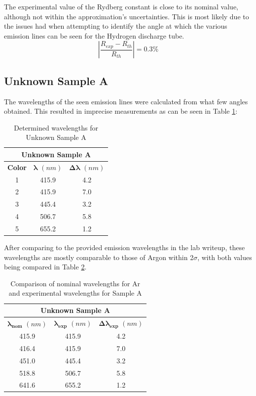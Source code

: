 \documentclass[a4paper, twocolumn]{article}
\begin{document}
The experimental value of the Rydberg constant is close to its nominal value, although not within the approximation's uncertainties. This is most likely due to the
issues had when attempting to identify the angle at which the various emission lines can be seen for the Hydrogen discharge tube.
\begin{equation*}
\left|\frac{R_{exp}-R_{th}}{R_{th}}\right| = 0.3\%
\end{equation*}

\subsection{Unknown Sample A}

The wavelengths of the seen emission lines were calculated from what few angles obtained. This resulted in imprecise measurements as can be seen in Table \ref{table:lambdaA}:
\begin{table}[h!]
\centering
\begin{tabular}{ |c||c|c| }
 \hline
 \multicolumn{3}{|c|}{\textbf{Unknown Sample A}} \\
 \hline
 \textbf{Color} & $\boldsymbol{\lambda}$ $(nm)$ & $\boldsymbol{\Delta\lambda}$ $(nm)$ \\
 \hline
 1 & 415.9 & 4.2 \\
 \hline
 2 & 415.9 & 7.0 \\
 \hline
 3 & 445.4 & 3.2 \\
 \hline
 4 & 506.7 & 5.8 \\
 \hline
 5 & 655.2 & 1.2 \\
 \hline
\end{tabular}
\caption{Determined wavelengths for Unknown Sample A}
\label{table:lambdaA}
\end{table}

After comparing to the provided emission wavelengths in the lab writeup, these wavelengths are mostly comparable to those of Argon within 2$\sigma$, 
with both values being compared in Table \ref{table:comparisonA}.

\begin{table}[h!]
\centering
\begin{tabular}{ |c|c|c| }
 \hline
 \multicolumn{3}{|c|}{\textbf{Unknown Sample A}} \\
 \hline
 $\boldsymbol{\lambda_{nom}}$ $(nm)$ & $\boldsymbol{\lambda_{exp}}$ $(nm)$ & $\boldsymbol{\Delta\lambda_{exp}}$  $(nm)$ \\
 \hline
 415.9 & 415.9 & 4.2 \\
 \hline
 416.4 & 415.9 & 7.0 \\
 \hline
 451.0 & 445.4 & 3.2 \\ 
 \hline
 518.8 & 506.7 & 5.8 \\
 \hline
 641.6 & 655.2 & 1.2 \\
 \hline
\end{tabular}
\caption{Comparison of nominal wavelengths for Ar and experimental wavelengths for Sample A}
\label{table:comparisonA}
\end{table}
\end{document}
